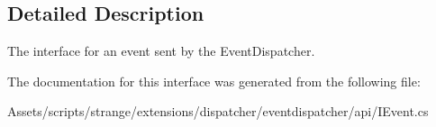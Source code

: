 \subsection{Detailed Description}
The interface for an event sent by the Event\-Dispatcher. 

The documentation for this interface was generated from the following file\-:\begin{DoxyCompactItemize}
\item 
Assets/scripts/strange/extensions/dispatcher/eventdispatcher/api/I\-Event.\-cs\end{DoxyCompactItemize}
